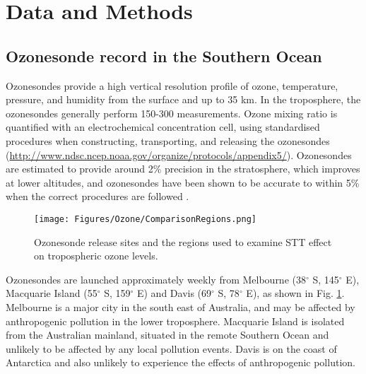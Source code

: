 \section{Data and Methods}
  \label{Ozone:DataMethods}

  \subsection{Ozonesonde record in the Southern Ocean}
    \label{Ozone:ozonesondes}
    Ozonesondes provide a high vertical resolution profile of ozone, temperature, pressure, and humidity from the surface and up to 35 km.
    In the troposphere, the ozonesondes generally perform 150-300 measurements.    
    Ozone mixing ratio is quantified with an electrochemical concentration cell, using standardised procedures when constructing, transporting, and releasing the ozonesondes (\url{http://www.ndsc.ncep.noaa.gov/organize/protocols/appendix5/}).
    Ozonesondes are estimated to provide around 2\% precision in the stratosphere, which improves at lower altitudes, and ozonesondes have been shown to be accurate to within 5\% when the correct procedures are followed \parencite{Smit2007}.
    
    \begin{figure}
      \texttt{[image: Figures/Ozone/ComparisonRegions.png]}
      \caption{Ozonesonde release sites and the regions used to examine STT effect on tropospheric ozone levels.}
      \label{Ozone:fig:ComparisonRegion}
    \end{figure}
    
    Ozonesondes are launched approximately weekly from Melbourne (38$^{\circ}$ S, 145$^{\circ}$ E), Macquarie Island (55$^{\circ}$ S, 159$^{\circ}$ E) and Davis (69$^{\circ}$ S, 78$^{\circ}$ E), as shown in Fig. \ref{Ozone:fig:ComparisonRegion}. 
    Melbourne is a major city in the south east of Australia, and may be affected by anthropogenic pollution in the lower troposphere.
    Macquarie Island is isolated from the Australian mainland, situated in the remote Southern Ocean and unlikely to be affected by any local pollution events.
    Davis is on the coast of Antarctica and also unlikely to experience the effects of anthropogenic pollution.
    
